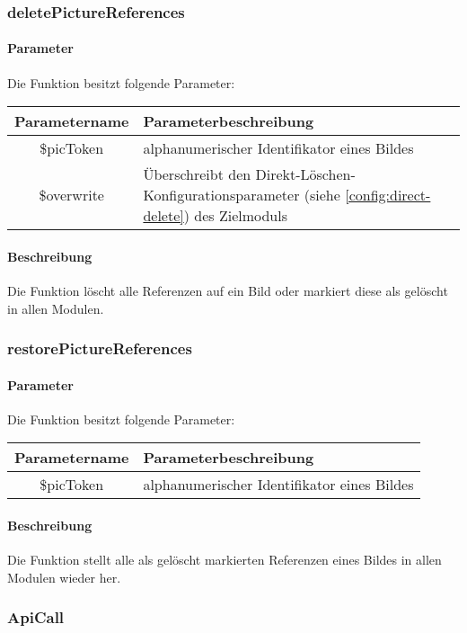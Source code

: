 \subsubsection{deletePictureReferences}
\paragraph{Parameter} Die Funktion besitzt folgende Parameter:
\begin{table}[H]
	\begin{tabular}{|c|p{11cm}|}
		\hline
		\textbf{Parametername} & \textbf{Parameterbeschreibung} \\ \hline
		\$picToken  & alphanumerischer Identifikator eines Bildes \\ \hline
		\$overwrite & Überschreibt den Direkt-Löschen-Konfigurationsparameter (siehe \autoref{config:direct-delete}) des Zielmoduls \\ \hline
	\end{tabular}
\end{table}
\paragraph{Beschreibung} Die Funktion löscht alle Referenzen auf ein Bild oder markiert diese als gelöscht in allen Modulen. 
\subsubsection{restorePictureReferences}
\paragraph{Parameter} Die Funktion besitzt folgende Parameter:
\begin{table}[H]
	\begin{tabular}{|c|p{11cm}|}
		\hline
		\textbf{Parametername} & \textbf{Parameterbeschreibung} \\ \hline
		\$picToken & alphanumerischer Identifikator eines Bildes \\ \hline
	\end{tabular}
\end{table}
\paragraph{Beschreibung} Die Funktion stellt alle als gelöscht markierten Referenzen eines Bildes in allen Modulen wieder her.
\subsubsection{ApiCall}

